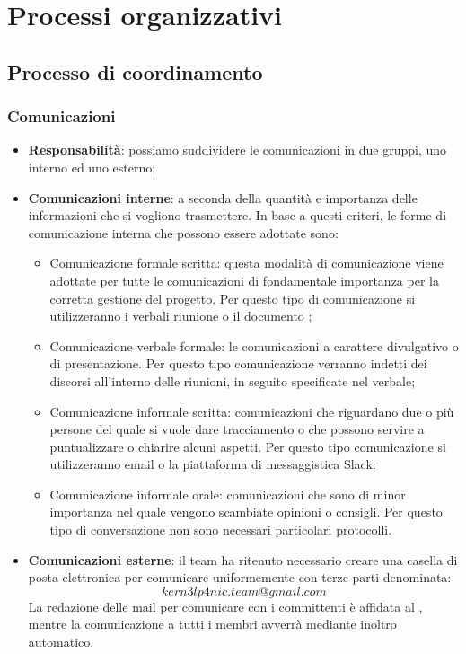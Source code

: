 \documentclass[../NormeDiProgetto.tex]{subfiles}
\begin{document}
\section{Processi organizzativi}
\subsection{Processo di coordinamento}
\subsubsection{Comunicazioni}
\begin{itemize}
\item \textbf{Responsabilità}:
possiamo suddividere le comunicazioni in due gruppi, uno interno ed uno esterno;
\item \textbf{Comunicazioni interne}:
a seconda della quantità e importanza delle informazioni che si vogliono trasmettere.
In base a questi criteri, le forme di comunicazione interna che possono essere adottate sono:
\begin{itemize}
\item Comunicazione formale scritta: questa modalità di comunicazione viene adottate per tutte le comunicazioni di fondamentale importanza per la corretta gestione del progetto. Per questo tipo di comunicazione si utilizzeranno i verbali riunione o il documento \gl{\pianodiprogettov};
\item Comunicazione verbale formale: le comunicazioni a carattere divulgativo o di presentazione. Per questo tipo comunicazione verranno indetti dei discorsi all'interno delle riunioni, in seguito specificate nel verbale;
\item Comunicazione informale scritta: comunicazioni che riguardano due o più persone del quale si vuole dare tracciamento o che possono servire a puntualizzare o chiarire alcuni aspetti. Per questo tipo comunicazione si utilizzeranno email o la piattaforma di messaggistica Slack;
\item Comunicazione informale orale: comunicazioni che sono di minor importanza nel quale vengono scambiate opinioni o consigli. Per questo tipo di conversazione non sono necessari particolari protocolli.
\end{itemize}
\item \textbf{Comunicazioni esterne}:
il team ha ritenuto necessario creare una casella di posta elettronica per comunicare uniformemente con terze parti denominata:\\
\begin{equation*}
	kern3lp4nic.team@gmail.com
\end{equation*}
La redazione delle mail per comunicare con i committenti è affidata al \responsabilediprogetto, mentre la comunicazione a tutti i membri avverrà mediante inoltro automatico.
\end{itemize}
\end{document}
